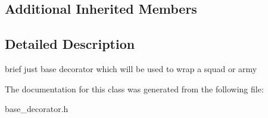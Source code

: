 \subsection*{Additional Inherited Members}


\subsection{Detailed Description}
brief just base decorator which will be used to wrap a squad or army 

The documentation for this class was generated from the following file\+:\begin{DoxyCompactItemize}
\item 
base\+\_\+decorator.\+h\end{DoxyCompactItemize}
